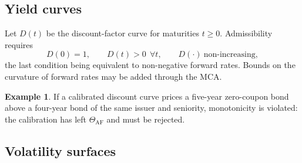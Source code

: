 \documentclass[11pt]{book}
\theoremstyle{plain}
\theoremstyle{definition}
\newtheorem{example}[theorem]{Example}
\theoremstyle{remark}
\begin{document}
\subsection{Yield curves}

Let $D(t)$ be the discount-factor curve for maturities $t\ge0$. Admissibility
requires
\[
    D(0)=1,\qquad D(t)>0\ \ \forall t,\qquad D(\cdot)\ \text{non-increasing},
\]
the last condition being equivalent to non-negative forward rates. Bounds on the
curvature of forward rates may be added through the MCA.

\begin{example}
If a calibrated discount curve prices a five-year zero-coupon bond above a
four-year bond of the same issuer and seniority, monotonicity is violated: the
calibration has left $\Theta_{\mathrm{AF}}$ and must be rejected.
\end{example}

\subsection{Volatility surfaces}
\end{document}

